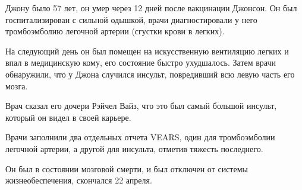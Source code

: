 Джону было 57 лет, он умер через 12 дней после вакцинации Джонсон. Он был
госпитализирован с сильной одышкой, врачи диагностировали у него тромбоэмболию
легочной артерии (сгустки крови в легких).

На следующий день он был помещен на искусственную вентиляцию легких и впал в
медицинскую кому, его состояние быстро ухудшалось. Затем врачи обнаружили, что у
Джона случился инсульт, повредивший всю левую часть его мозга.

Врач сказал его дочери Рэйчел Вайз, что это был самый большой инсульт, который
он видел в своей карьере.

Врачи заполнили два отдельных отчета VEARS, один для тромбоэмболии легочной
артерии, а другой для инсульта, отметив тяжесть последнего.

Он был в состоянии мозговой смерти, и был отключен от системы жизнеобеспечения,
скончался 22 апреля.

